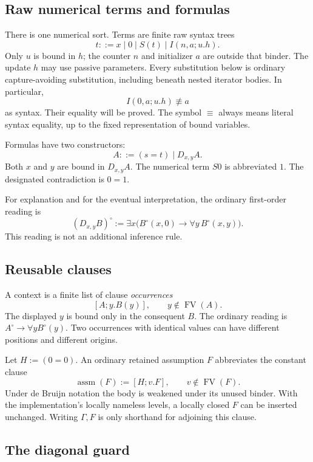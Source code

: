 \documentclass[11pt]{article}
\theoremstyle{definition}\newtheorem{definition}[theorem]{Definition}
\theoremstyle{remark}\newtheorem{remark}[theorem]{Remark}
\newcommand{\assm}{\operatorname{assm}}
\newcommand{\FV}{\operatorname{FV}}
\begin{document}
\subsection{Raw numerical terms and formulas}

There is one numerical sort. Terms are finite raw syntax trees
\[
 t::=x\mid 0\mid S(t)\mid I(n,a;u.h).
\]
Only $u$ is bound in $h$; the counter $n$ and initializer $a$ are outside that binder. The update $h$ may use passive parameters. Every substitution below is ordinary capture-avoiding substitution, including beneath nested iterator bodies. In particular,
\[
 I(0,a;u.h)\not\equiv a
\]
as syntax. Their equality will be proved. The symbol $\equiv$ always means literal syntax equality, up to the fixed representation of bound variables.

Formulas have two constructors:
\[
 A::=(s=t)\mid D_{x,y}A.
\]
Both $x$ and $y$ are bound in $D_{x,y}A$. The numerical term $S0$ is abbreviated $1$. The designated contradiction is $0=1$.

For explanation and for the eventual interpretation, the ordinary first-order reading is
\begin{equation}\label{eq:Dreading}
 (D_{x,y}B)^{\circ}:=\exists x\bigl(B^{\circ}(x,0)\to\forall y\,B^{\circ}(x,y)\bigr).
\end{equation}
This reading is not an additional inference rule.

\subsection{Reusable clauses}

A context is a finite list of clause \emph{occurrences}
\[
 [A;y.B(y)],\qquad y\notin\FV(A).
\]
The displayed $y$ is bound only in the consequent $B$. The ordinary reading is $A^{\circ}\to\forall yB^{\circ}(y)$. Two occurrences with identical values can have different positions and different origins.

Let $H:=(0=0)$. An ordinary retained assumption $F$ abbreviates the constant clause
\begin{equation}\label{eq:ordinary}
 \assm(F):=[H;v.F],\qquad v\notin\FV(F).
\end{equation}
Under de Bruijn notation the body is weakened under its unused binder. With the implementation's locally nameless levels, a locally closed $F$ can be inserted unchanged. Writing $\Gamma,F$ is only shorthand for adjoining this clause.

\subsection{The diagonal guard}
\end{document}
